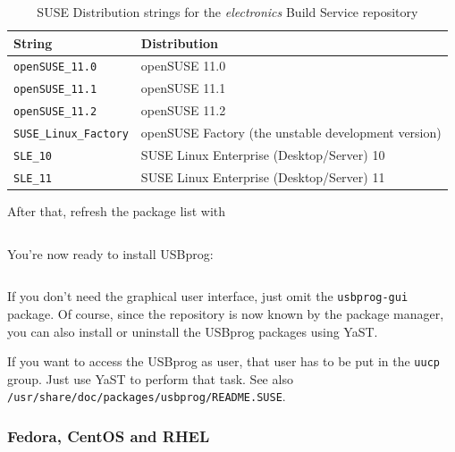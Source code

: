 \documentclass[bibtotoc,UKenglish,halfparskip,oneside,DIV12]{scrreprt}
\begin{document}
\begin{table}[ht]
  \centering
  \begin{tabular}{|p{4cm}p{10cm}|}
    \hline
    \textbf{String}                 & \textbf{Distribution}                               \\
    \hline
    \hline
    \texttt{openSUSE\_11.0}         & openSUSE 11.0                                       \\
    \texttt{openSUSE\_11.1}         & openSUSE 11.1                                       \\
    \texttt{openSUSE\_11.2}         & openSUSE 11.2                                       \\
    \texttt{SUSE\_Linux\_Factory}   & openSUSE Factory (the unstable development version) \\
    \texttt{SLE\_10}                & SUSE Linux Enterprise (Desktop/Server) 10           \\
    \texttt{SLE\_11}                & SUSE Linux Enterprise (Desktop/Server) 11           \\
    \hline
  \end{tabular}
  \caption{SUSE Distribution strings for the \emph{electronics} Build Service repository}
  \label{tab:susedistributions}
\end{table}

After that, refresh the package list with

\begin{lstlisting}[style=inline]
% sudo zypper ref
\end{lstlisting}

You're now ready to install USBprog:

\begin{lstlisting}[style=inline]
% sudo zypper install usbprog usbprog-gui
\end{lstlisting}

If you don't need the graphical user interface, just omit the \texttt{usbprog-gui} package. Of
course, since the repository is now known by the package manager, you can also install or uninstall
the USBprog packages using YaST.

If you want to access the USBprog as user, that user has to be put in the \texttt{uucp} group. Just
use YaST to perform that task. See also \texttt{/usr/share/doc/packages/usbprog/README.SUSE}.

\subsubsection{Fedora, CentOS and RHEL}
\end{document}
